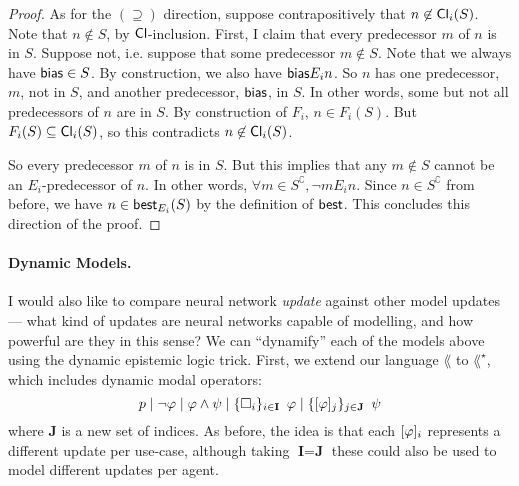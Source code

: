 \documentclass[letterpaper]{article}
\begin{document}
\begin{proof}
        As for the $(\supseteq)$ direction, suppose contrapositively that $n \not \in \mathsf{Cl}_i(S)$. Note that $n \not \in S$, by $\mathsf{Cl}$-inclusion.  First, I claim that every predecessor $m$ of $n$ is in $S$.  Suppose not, i.e. suppose that some predecessor $m \not \in S$.  Note that we always have $\mathsf{bias} \in S$.  By construction, we also have $\mathsf{bias}{E_i}n$.  So $n$ has one predecessor, $m$, not in $S$, and another predecessor, $\mathsf{bias}$, in $S$.  In other words, some but not all predecessors of $n$ are in $S$.  By construction of $F_i$, $n \in F_i(S)$.  But $F_i(S) \subseteq \mathsf{Cl}_i(S)$, so this contradicts $n \not \in \mathsf{Cl}_i(S)$.

        So every predecessor $m$ of $n$ is in $S$.  But this implies that any $m \not \in S$ cannot be an $E_i$-predecessor of $n$.  In other words, $\forall m \in S^\complement, \neg m{E_i}n$.  Since $n \in S^\complement$ from before, we have $n \in \mathsf{best}_{E_i}(S)$ by the definition of $\mathsf{best}$.  This concludes this direction of the proof.
    \end{proof}

    

\paragraph*{Dynamic Models.}

I would also like to compare neural network \emph{update} against other model updates --- what kind of updates are neural networks capable of modelling, and how powerful are they in this sense?  We can ``dynamify'' each of the models above using the dynamic epistemic logic trick.  First, we extend our language $\lang$ to $\lang^\star$, which includes dynamic modal operators:
\[
    p \mid \neg \varphi \mid \varphi \land \psi \mid \{ \Box_i \}_{i \in \textbf{I}} \hspace*{0.5em} \varphi \mid \{ [\varphi]_j \}_{j \in \textbf{J}} \hspace*{0.5em} \psi
\]
where \textbf{J} is a new set of indices.  As before, the idea is that each $[\varphi]_i$ represents a different update per use-case, although taking $\textbf{I} = \textbf{J}$ these could also be used to model different updates per agent.
\end{document}
